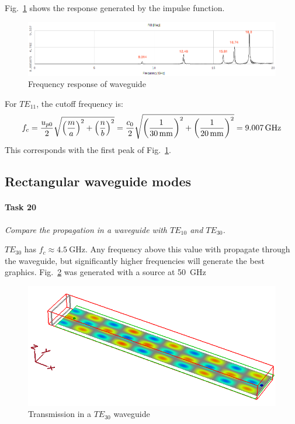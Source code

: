 Fig.~\ref{fig:Task16-Analyzer} shows the response generated by the impulse function.
\begin{figure}[tbph]
	\centering
	\includegraphics[width=0.95\linewidth]{graphics/Task16-Analyzer-annotated}
	\caption{Frequency response of waveguide}
	\label{fig:Task16-Analyzer}
\end{figure}

For $TE_{11}$, the cutoff frequency is:
\begin{align*}
	f_c = {u_{p0} \over 2} \sqrt{\left({m \over a}\right)^2 + \left({n \over b}\right)^2} = {c_0 \over 2} \sqrt{\left({1 \over \SI{30}{\milli\meter}}\right)^2 + \left({1 \over \SI{20}{\milli\meter}}\right)^2} = \SI{9.007}{\giga\hertz}
\end{align*}
This corresponds with the first peak of Fig.~\ref{fig:Task16-Analyzer}.


\subsection{Rectangular waveguide modes}
\paragraph{Task 20}\textit{Compare the propagation in a waveguide with $TE_{10}$ and $TE_{30}$.}

$TE_{30}$ has $f_c \approx \SI{4.5}{\giga\hertz}$.
Any frequency above this value with propagate through the waveguide, but significantly higher frequencies will generate the best graphics.
Fig.~\ref{fig:Task20-T30-50GHz} was generated with a source at \SI{50}{\giga\hertz}

\begin{figure}[tbph]
	\centering
	\includegraphics[width=0.7\linewidth]{graphics/Task20-T30-50GHz}
	\caption{Transmission in a $TE_{30}$ waveguide}
	\label{fig:Task20-T30-50GHz}
\end{figure}
